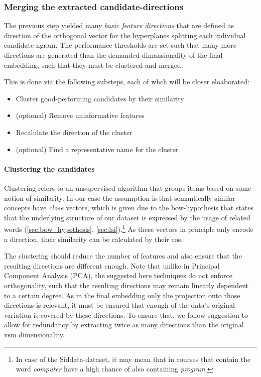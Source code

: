 
\subsubsection{Merging the extracted candidate-directions}
\label{sec:algo:cluster}

The previous step yielded many \textit{basic feature directions} that are defined as direction of the orthogonal vector for the hyperplanes splitting each individual candidate \gls{ngram}. The performance-thresholds are set such that many more directions are generated than the demanded dimansionality of the final embedding, such that they must be clustered and merged.

This is done via the following substeps, each of whch will be closer eloaborated:

\begin{itemize}
	\item Cluster good-performing candidates by their similarity
	\item (optional) Remove uninformative features
	\item Recalulate the direction of the cluster
	\item (optional) Find a representative name for the cluster
\end{itemize}

\paragraph{Clustering the candidates}

Clustering refers to an unsupervised algorithm that groups items based on some notion of similarity. In our case the assumption is that semantically similar concepts have \textit{close} vectors, which is given due to the \gls{bow}-hypothesis that states that the underlying structure of our dataset is expressed by the usage of related words (\autoref{sec:bow_hypothesis}, \ref{sec:lsi}).\footnote{In case of the Siddata-dataset, it may mean that in courses that contain the word \textit{computer} have a high chance of also containing \textit{program}.} As these vectors in principle only encode a direction, their similarity can be calculated by their \gls{cos}.

The clustering should reduce the number of features and also ensure that the resulting directions are different enough. Note that unlike \eg in Principal Component Analysis (PCA), the suggested here techniques do not enforce orthogonality, such that the resulting directions may remain linearly dependent to a certain degree. As in the final embedding only the projection onto those directions is relevant, it must be ensured that enough of the data's original variation is covered by these directions. To ensure that, we follow  suggestion to allow for redundancy by extracting twice as many directions than the original \gls{vsm} dimensionality. 

